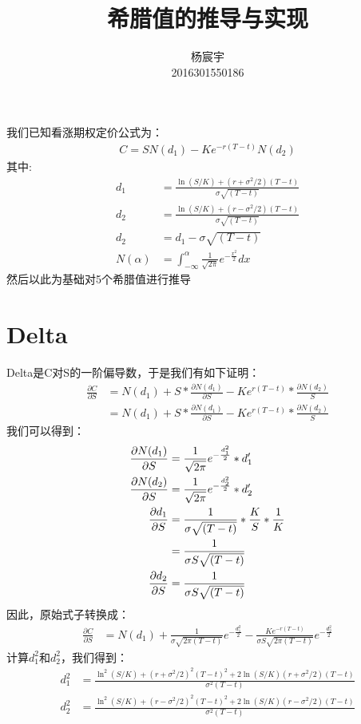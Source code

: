 \documentclass{ctexart}
\title{\heiti \zihao{2} 希腊值的推导与实现}
\author{\heiti \zihao{5}杨宸宇\\\heiti \zihao{5}2016301550186}
\date{}
\begin{document}
    \maketitle
    
    \noindent 我们已知看涨期权定价公式为：
    \begin{align}
        C=SN(d_1)-Ke^{-r(T-t)}N(d_2)
    \end{align}
    其中:
    \begin{align}
        d_1 & = \frac{\ln{(S/K)}+(r+\sigma^{2}/2)(T-t)}{\sigma\sqrt{(T-t)}}\\
        d_2 & = \frac{\ln{(S/K)}+(r-\sigma^{2}/2)(T-t)}{\sigma\sqrt{(T-t)}}\\
        d_2 & = d_1 - \sigma \sqrt{(T-t)}\label{d12}\\
        N(\alpha) & = \int_{-\infty}^\alpha \frac{1}{\sqrt{2\pi}}e^{-\frac{x^{2}}{2}}dx
    \end{align}
    然后以此为基础对5个希腊值进行推导


    \section{Delta}
    \noindent Delta是C对S的一阶偏导数，于是我们有如下证明：
    \begin{align}
        \frac{\partial C}{\partial S} & = N(d_1)+S*\frac{\partial N(d_1)}{\partial S}-Ke^{r(T-t)}*\frac{\partial N(d_2)}{S}\\
        & = N(d_1)+S*\frac{\partial N(d_1)}{\partial S}-Ke^{r(T-t)}*\frac{\partial N(d_2)}{S}
    \end{align}
    我们可以得到：
    \begin{align}
        \frac{\partial N(d_1)}{\partial S} & = \frac{1}{\sqrt{2\pi}}e^{-\frac{d_1^2}{2}}*d'_1\\
        \frac{\partial N(d_2)}{\partial S} & = \frac{1}{\sqrt{2\pi}}e^{-\frac{d_2^2}{2}}*d'_2\\
        \frac{\partial d_1}{\partial S}  & =  \frac{1}{\sigma\sqrt{(T-t)}}*\frac{K}{S}*\frac{1}{K}\notag \\
             & =  \frac{1}{\sigma S \sqrt{(T-t)}}\\
        \frac{\partial d_2}{\partial S}  & =  \frac{1}{\sigma S \sqrt{(T-t)}}
    \end{align}
    因此，原始式子转换成：
    \begin{align}
        \frac{\partial C}{\partial S} & = N(d_1)+\frac{1}{\sigma \sqrt{2\pi (T-t)}}e^{-\frac{d^2_1}{2}}-\frac{Ke^{-r(T-t)}}{\sigma S \sqrt{2\pi (T-t)}}e^{-\frac{d^2_2}{2}} \label{delta}
    \end{align}
    计算$d_1^2$和$d_2^2$，我们得到：
    \begin{align}
        d_1^2 & = \frac{\ln^2{(S/K)}+(r+\sigma ^2 /2)^2 (T-t)^2 + 2\ln{(S/K)}(r+\sigma ^2/2)(T-t)}{\sigma^2 (T-t)}\\
        d_2^2 & = \frac{\ln^2{(S/K)}+(r-\sigma ^2 /2)^2 (T-t)^2 + 2\ln{(S/K)}(r-\sigma ^2/2)(T-t)}{\sigma^2 (T-t)}
    \end{align}
\end{document}

